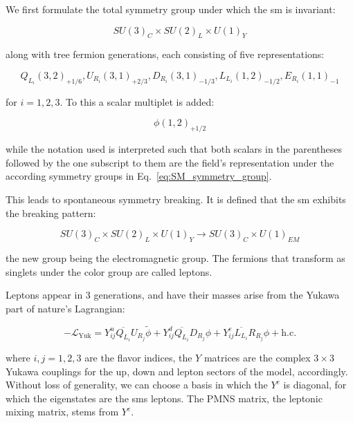 \documentclass[thesis/Elad_Kliger_Thesis.tex]{subfiles}
\begin{document}
We first formulate the total symmetry group under which the \gls{sm} is invariant:

\begin{equation}
    \label{eq:SM_symmetry_group}
    SU(3)_C \times SU(2)_L \times U(1)_Y
\end{equation}

\noindent along with tree fermion generations, each consisting of five representations:

\begin{equation}
    Q_{L_i}(3, 2)_{+1/6}, U_{R_i}(3, 1)_{+2/3}, D_{R_i}(3, 1)_{-1/3}, L_{L_i}(1, 2)_{-1/2}, E_{R_i}(1, 1)_{-1}
\end{equation}

\noindent for $i=1,2,3$. To this a scalar multiplet is added:

\begin{equation}
    \phi(1, 2)_{+1/2}
\end{equation}

\noindent while the notation used is interpreted such that both scalars in the parentheses followed by the one subscript to them are the field's representation under the according symmetry groups in Eq.~\ref{eq:SM_symmetry_group}.

This leads to spontaneous symmetry breaking. It is defined that the \gls{sm} exhibits the breaking pattern:

\begin{equation}
    \label{eq:sm_symmtery_breaking_pattern}
    SU(3)_C \times SU(2)_L \times U(1)_Y \to SU(3)_C \times U(1)_{EM}
\end{equation}

\noindent the new group being the electromagnetic group. The fermions that transform as singlets under the color group are called leptons.

Leptons appear in 3 generations, and have their masses arise from the Yukawa part of nature's Lagrangian:

\begin{equation}
    \label{eq:yukawa_lagrangian}
    -\mathcal{L}_{\text{Yuk}}
    = Y^{u}_{ij}\overline{Q_{L_i}}U_{R_j}\tilde{\phi}
    + Y^{d}_{ij}\overline{Q_{L_i}}D_{R_j}\phi
    + Y^{e}_{ij}\overline{L_{L_i}}R_{R_j}\phi
    + \text{h.c.}
\end{equation}

\noindent where $i, j = 1, 2, 3$ are the flavor indices, the $Y$ matrices are the complex $3 \times 3$ Yukawa couplings for the up, down and lepton sectors of the model, accordingly. Without loss of generality, we can choose a basis in which the $Y^{e}$ is diagonal, for which the eigenstates are the \glspl{sm} leptons. The PMNS matrix, the leptonic mixing matrix, stems from $Y^e$.
\end{document}
